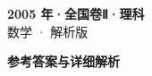 \documentclass[zihao=-4, a4paper]{ctexart}
\begin{document}
\begin{center}
  {\Large\bfseries 2005 年·全国卷Ⅱ·理科}\\[4pt]
  {\large 数学 · 解析版}
\end{center}
\medskip
{}

\clearpage
{}
\begin{center}{\Large\bfseries 参考答案与详细解析}\end{center}
\medskip

\end{document}

